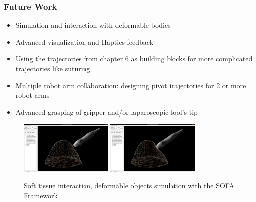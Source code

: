 \begin{frame}
\frametitle{Future Work}
\begin{itemize}
\item Simulation and interaction with deformable bodies
\item Advanced visualization and Haptics feedback
\item Using the trajectories from chapter 6 as building blocks for more complicated trajectories like suturing
\item Multiple robot arm collaboration: designing pivot trajectories for 2 or more robot arms
\item Advanced grasping of gripper and/or laparoscopic tool's tip
\end{itemize}
\begin{center}
\begin{figure}[!htb]
\centering
\includegraphics[width=0.4\textwidth]{../images/future-work-sofa1.png}
\includegraphics[width=0.4\textwidth]{../images/future-work-sofa2.png}\\
\caption{Soft tissue interaction, deformable objects simulation with the SOFA Framework}
\end{figure}
\end{center}
\end{frame}

